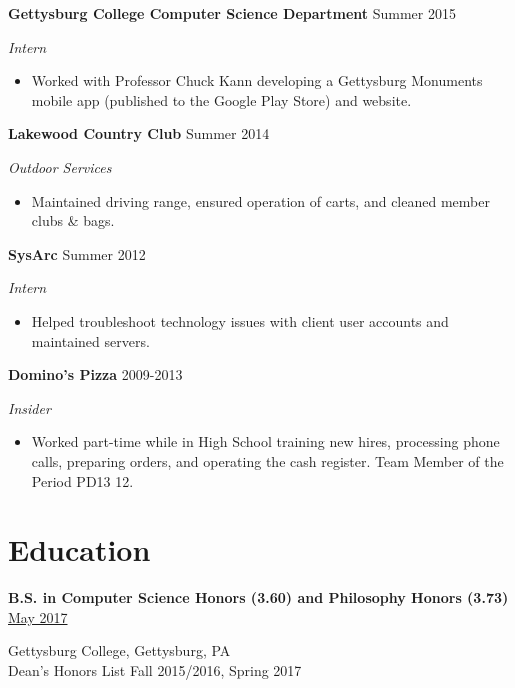 \documentclass[11pt]{article}
\begin{document}
\textbf{Gettysburg College Computer Science Department}
\hfill
Summer 2015

\textit{Intern}

\begin{itemize}
\item[] Worked with Professor Chuck Kann developing a Gettysburg Monuments mobile app (published to the Google Play Store) and website. \\
\end{itemize}

\textbf{Lakewood Country Club}
\hfill
Summer 2014

\textit{Outdoor Services}

\begin{itemize}
\item[] Maintained driving range, ensured operation of carts, and cleaned member clubs \& bags. \\
\end{itemize}

\textbf{SysArc}
\hfill
Summer 2012

\textit{Intern}

\begin{itemize}
\item[]  Helped troubleshoot technology issues with client user accounts and maintained servers. \\
\end{itemize}

\textbf{Domino's Pizza}
\hfill
2009-2013

\textit{Insider}

\begin{itemize}
\item[]  Worked part-time while in High School training new hires, processing phone calls, preparing orders, and operating the cash register. Team Member of the Period PD13 12.
\end{itemize}

\section*{Education}
\textbf{B.S. in Computer Science {\footnotesize Honors (3.60)} and Philosophy {\footnotesize Honors (3.73)}}
\hfill
\href{https://www.gettysburg.edu/commencement/2017/pdfs/2017\%20Commencement\%20Program\%20FINAL.pdf}{May 2017}


Gettysburg College, Gettysburg, PA \\

Dean's Honors List \hfill Fall 2015/2016, Spring 2017
\end{document}
